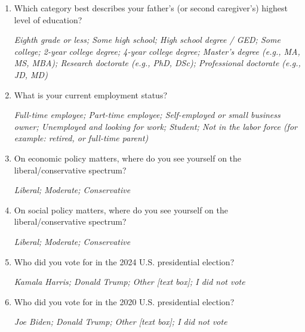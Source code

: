 \documentclass[11pt, headsepline]{article}
\begin{document}
\begin{enumerate}[resume]
    \item Which category best describes your father's (or second caregiver's) highest level of education?

    \textit{Eighth grade or less; Some high school; High school degree / GED; Some college; 2-year college degree; 4-year college degree; Master’s degree (e.g., MA, MS, MBA); Research doctorate (e.g., PhD, DSc); Professional doctorate (e.g., JD, MD)}

    \item What is your current employment status?

    \textit{Full-time employee; Part-time employee; Self-employed or small business owner; Unemployed and looking for work; Student; Not in the labor force (for example: retired, or full-time parent)}

    \item On economic policy matters, where do you see yourself on the liberal/conservative spectrum?
    
    \textit{Liberal; Moderate; Conservative}

    \item On social policy matters, where do you see yourself on the liberal/conservative spectrum?
    
    \textit{Liberal; Moderate; Conservative}

    \item Who did you vote for in the 2024 U.S. presidential election?

    \textit{Kamala Harris; Donald Trump; Other [text box]; I did not vote}

    \item Who did you vote for in the 2020 U.S. presidential election?

    \textit{Joe Biden; Donald Trump; Other [text box]; I did not vote}



\end{enumerate}
\end{document}
